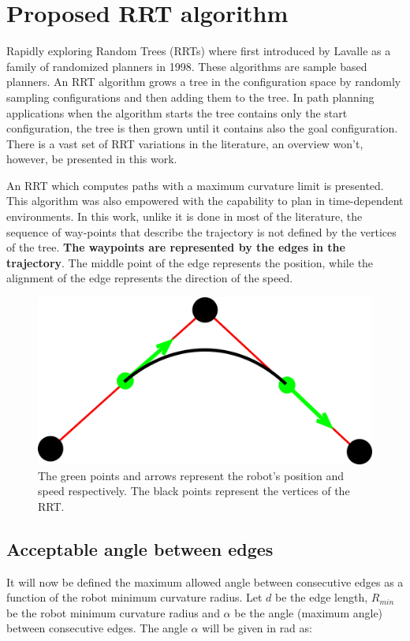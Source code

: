 \section{Proposed RRT algorithm}
Rapidly exploring Random Trees (RRTs) where first introduced by Lavalle as a family of randomized planners \cite{LavalleRRT} in 1998. These algorithms are sample based planners. An RRT algorithm grows a tree in the configuration space by randomly sampling configurations and then adding them to the tree. In path planning applications when the algorithm starts the tree contains only the start configuration, the tree is then grown until it contains also the goal configuration. There is a vast set of RRT variations in the literature, an overview won't, however, be presented in this work.
\par
 An RRT which computes paths with a maximum curvature limit is presented. This algorithm was also empowered with the capability to plan in time-dependent environments. In this work, unlike it is done in most of the literature, the sequence of way-points that describe the trajectory is not defined by the vertices of the tree. \textbf{The waypoints are represented by the edges in the trajectory}. The middle point of the edge represents the position, while the alignment of the edge represents the direction of the speed.

\begin{figure}[ht!]
    \centering
    \includegraphics[width=0.4\linewidth]{Figures/04_rrt/waypointsNedges.png}
    \caption{The green points and arrows represent the robot's position and speed respectively. The black points represent the vertices of the RRT.}
    \label{robotStates}
\end{figure}

\subsection{Acceptable angle between edges}
It will now be defined the maximum allowed angle between consecutive edges as a function of the robot minimum curvature radius. Let $d$ be the edge length, $R_{min}$ be the robot minimum curvature radius and $\alpha$ be the angle (maximum angle) between consecutive edges. The angle $\alpha$ will be given in rad as:


